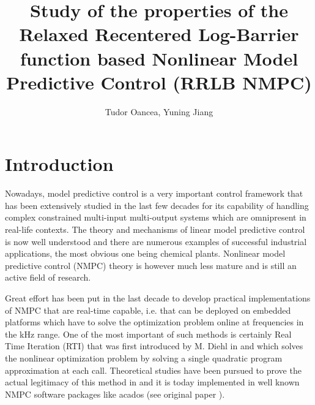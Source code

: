 \documentclass[conference]{IEEEtran}
\theoremstyle{definition}
\theoremstyle{remark}
\begin{document}
\title{Study of the properties of the Relaxed Recentered Log-Barrier function based Nonlinear Model Predictive Control (RRLB NMPC)}

\author{Tudor Oancea, Yuning Jiang}%
        

\maketitle

\begin{abstract}

\end{abstract}

\section{Introduction}
Nowadays, model predictive control is a very important control framework that has been extensively studied in the last few decades for its capability of handling complex constrained multi-input multi-output systems which are omnipresent in real-life contexts. 
The theory and mechanisms of linear model predictive control is now well understood and there are numerous examples of successful industrial applications, the most obvious one being chemical plants.
Nonlinear model predictive control (NMPC) theory is however much less mature and is still an active field of research.

Great effort has been put in the last decade to develop practical implementations of NMPC that are real-time capable, i.e. that can be deployed on embedded platforms which have to solve the optimization problem online at frequencies in the kHz range.
One of the most important of such methods is certainly Real Time Iteration (RTI) that was first introduced by M. Diehl in \cite*{rti-diehl} and which solves the nonlinear optimization problem by solving a single quadratic program approximation at each call.
Theoretical studies have been pursued to prove the actual legitimacy of this method in \cite{rti-diehl-stability} and it is today implemented in well known NMPC software packages like acados (see original paper \cite*{acados}).
\end{document}
